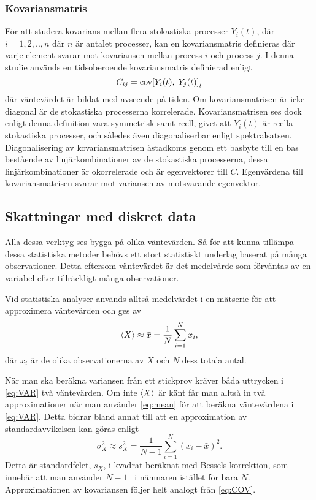 \subsubsection{Kovariansmatris}\label{sec:kovmatris}
För att studera kovarians mellan flera stokastiska processer $Y_i(t)$, där $i=1,2,..,n$ där $n$ är antalet processer, kan en kovariansmatris definieras där varje element svarar mot kovariansen mellan process $i$ och process $j$. I denna studie används en tidsoberoende kovariansmatris definierad enligt 
\begin{equation}
\label{eq:kovmatris}
    C_{ij} = \text{cov}\!\left[Y_i(t),\;Y_j(t)\right]_t
\end{equation}
där väntevärdet är bildat med avseende på tiden. Om kovariansmatrisen är icke-diagonal är de stokastiska processerna korrelerade. Kovariansmatrisen ses dock enligt denna definition vara symmetrisk samt reell, givet att $Y_i(t)$ är reella stokastiska processer, och således även diagonaliserbar enligt spektralsatsen.  Diagonalisering av kovariansmatrisen åstadkoms genom ett basbyte till en bas bestående av linjärkombinationer av de stokastiska processerna, dessa linjärkombinationer är okorrelerade och är egenvektorer\cite{Shlens_PCA2014} till $C$. Egenvärdena till kovariansmatrisen svarar mot variansen av motsvarande egenvektor.


\subsection{Skattningar med diskret data} \label{sec:diskret_data}
Alla dessa verktyg ses bygga på olika väntevärden. Så för att kunna tillämpa dessa statistiska metoder behövs ett stort statistiskt underlag baserat på många observationer. Detta eftersom väntevärdet är det medelvärde som förväntas av en variabel efter tillräckligt många observationer.

Vid statistiska analyser används alltså medelvärdet i en
mätserie för att approximera väntevärden och ges av
\begin{equation}\label{eq:mean}
\ev{X} \approx \bar{x} = \frac{1}{N} \sum_{i=1}^N x_i,
\end{equation}
där $x_i$ är de olika observationerna av $X$ och $N$ dess totala antal. 

När man ska beräkna variansen från ett stickprov kräver båda uttrycken i \eqref{eq:VAR} två väntevärden. Om inte $\ev{X}$ är känt får man alltså in två approximationer när man använder \eqref{eq:mean} för att beräkna väntevärdena i \eqref{eq:VAR}. Detta bidrar bland annat till att en approximation av standardavvikelsen kan göras enligt
\begin{equation}\label{eq:standard_error}
\sigma_X^2 \approx s_X^2
=  \frac{1}{N-1} \sum_{i=1}^N \left(x_i-\bar{x}\right)^2.
\end{equation}
Detta är standardfelet, $s_X$, i kvadrat beräknat med Bessels korrektion, som innebär att man använder $N-1$~\cite{Rice_matstat2006} i nämnaren istället för bara $N$. Approximationen av kovariansen följer helt analogt från \eqref{eq:COV}.

